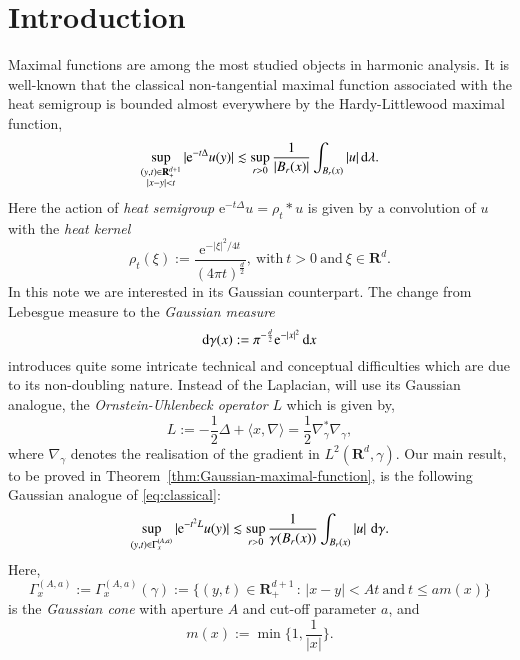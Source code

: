 \documentclass[preprint,12pt]{elsarticle}
\theoremstyle{remark}
\newcommand{\D}{\,\textup{d}}
\newcommand{\la}{\langle}
\newcommand{\ra}{\rangle}
\newcommand{\LHG}{{L^2(\R^d,\gamma)}}
\renewcommand{\leq}{\leqslant}
\newcommand{\R}{\mathbf R}
\newcommand{\e}{\mathrm{e}} %
\begin{document}


\section{Introduction}
Maximal functions are among the most studied objects in harmonic
analysis. 
It is well-known that the classical non-tangential maximal function associated
with the heat semigroup is bounded almost everywhere by the Hardy-Littlewood
maximal function,
\begin{equation}\label{eq:classical}
  \sup_{\substack{(y, t) \in   \R^{d + 1}_+\\ |x - y| < t}} |\e^{-t \Delta} u(y)| \lesssim \sup_{r
    > 0}  \frac1{|B_r(x)|}\int_{B_r(x)} |u| \D\lambda.
\end{equation}
Here the action of \emph{heat semigroup} $\e^{-t \Delta} u = \rho_t \ast u$ is
given by a convolution of $u$ with the \emph{heat kernel}
\begin{equation*}
  \rho_t(\xi) := \frac{\e^{-|\xi|^2/4t}}{(4\pi t)^{\frac{d}2}}, \:\text{with}\:
  t > 0 \:\text{and}\: \xi \in \R^d.
\end{equation*}
In this note we are interested in its Gaussian counterpart. The change from
Lebesgue measure to the \textit{Gaussian measure}
\begin{equation}
  \label{eq:Gaussian-measure}
  \mathrm{d}\gamma(x) := \pi^{-\frac{d}2} \e^{-|x|^2} \D{x}
\end{equation}
introduces quite some intricate technical and conceptual difficulties which are
due to its non-doubling nature. Instead of the Laplacian, will use its Gaussian
analogue, the \emph{Ornstein-Uhlenbeck operator} $L$ which is given by,
\begin{equation}
  \label{eq:Ornstein-Uhlenbeck-operator}
  L := -\frac12 \Delta + \la x, \nabla \ra = \frac12 \nabla_\gamma^* \nabla_\gamma,
\end{equation}
where $\nabla_\gamma$ denotes the realisation of the gradient in $\LHG$.
Our main result, to be proved in Theorem~\ref{thm:Gaussian-maximal-function},
is the following Gaussian analogue of \eqref{eq:classical}:
\begin{equation}
  \label{eq:main}
  \sup_{(y, t) \in \Gamma_x^{(A, a)}} |\e^{-t^2 L} u(y)| \lesssim \sup_{r > 0}
  \frac1{\gamma(B_r(x))}\int_{B_r(x)} |u| \, \D\gamma.
\end{equation}
Here, 
\begin{equation}
  \label{eq:Gaussian-cone}
  \Gamma_x^{(A, a)} := \Gamma_x^{(A, a)}(\gamma) := \{(y, t) \in \R^{d + 1}_+
  \,: \, |x - y| < At \:\text{and}\: t \leq a m(x)\}
\end{equation}
is the \textit{Gaussian cone} with aperture $A$ and cut-off parameter $a$, and
\begin{equation}\label{eq:m-function}
  m(x) := \min\biggl\{1, \frac1{|x|} \biggr\}.
\end{equation}
\end{document}
